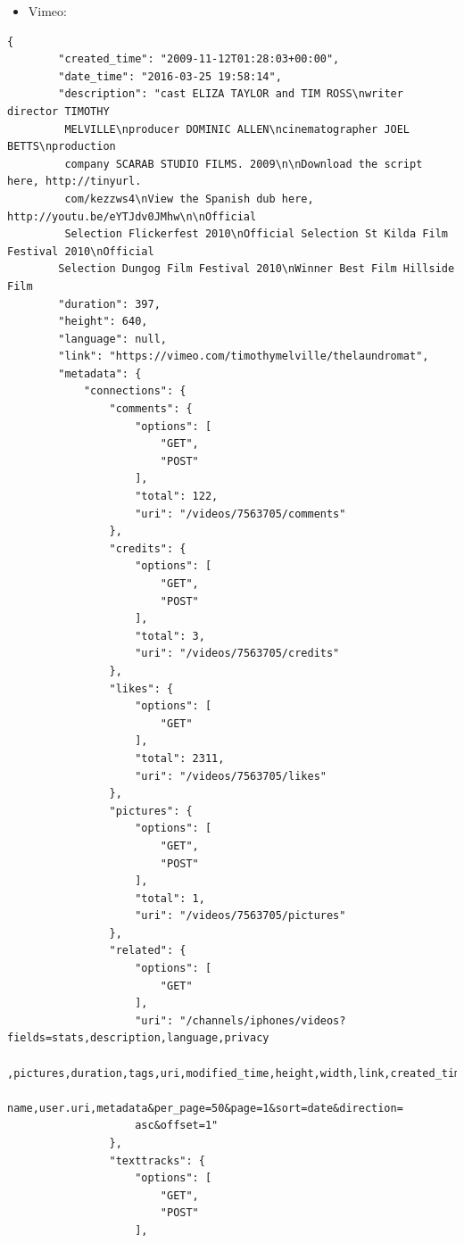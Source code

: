 \documentclass{article}
\begin{document}
\begin{itemize}
    \item Vimeo:
\end{itemize}
\begin{Verbatim}
{
        "created_time": "2009-11-12T01:28:03+00:00", 
        "date_time": "2016-03-25 19:58:14", 
        "description": "cast ELIZA TAYLOR and TIM ROSS\nwriter director TIMOTHY
         MELVILLE\nproducer DOMINIC ALLEN\ncinematographer JOEL BETTS\nproduction
         company SCARAB STUDIO FILMS. 2009\n\nDownload the script here, http://tinyurl.
         com/kezzws4\nView the Spanish dub here, http://youtu.be/eYTJdv0JMhw\n\nOfficial
         Selection Flickerfest 2010\nOfficial Selection St Kilda Film Festival 2010\nOfficial 
        Selection Dungog Film Festival 2010\nWinner Best Film Hillside Film
        "duration": 397, 
        "height": 640, 
        "language": null, 
        "link": "https://vimeo.com/timothymelville/thelaundromat", 
        "metadata": {
            "connections": {
                "comments": {
                    "options": [
                        "GET", 
                        "POST"
                    ], 
                    "total": 122, 
                    "uri": "/videos/7563705/comments"
                }, 
                "credits": {
                    "options": [
                        "GET", 
                        "POST"
                    ], 
                    "total": 3, 
                    "uri": "/videos/7563705/credits"
                }, 
                "likes": {
                    "options": [
                        "GET"
                    ], 
                    "total": 2311, 
                    "uri": "/videos/7563705/likes"
                }, 
                "pictures": {
                    "options": [
                        "GET", 
                        "POST"
                    ], 
                    "total": 1, 
                    "uri": "/videos/7563705/pictures"
                }, 
                "related": {
                    "options": [
                        "GET"
                    ], 
                    "uri": "/channels/iphones/videos?fields=stats,description,language,privacy
                    ,pictures,duration,tags,uri,modified_time,height,width,link,created_time,
                    name,user.uri,metadata&per_page=50&page=1&sort=date&direction=
                    asc&offset=1"
                }, 
                "texttracks": {
                    "options": [
                        "GET", 
                        "POST"
                    ], 

\end{Verbatim}
\end{document}
